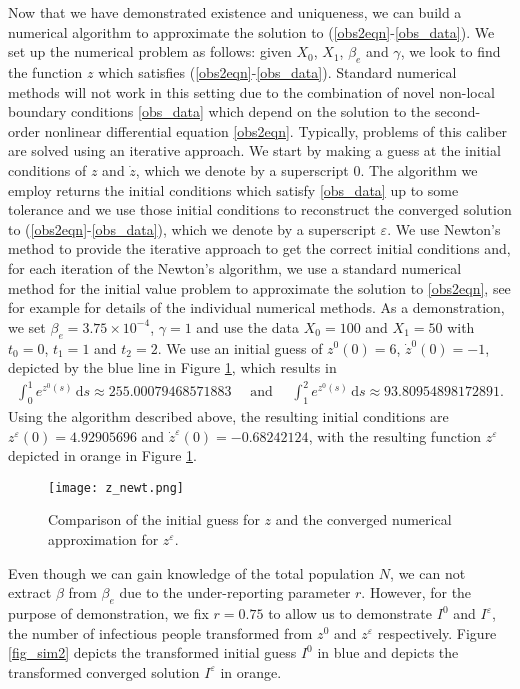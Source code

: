 \documentclass{article}
\newcommand{\ds}{\text{d}s}
\newcommand{\obs}{(\ref{obs2eqn}-\ref{obs_data})}
\newcommand{\be}{\beta_e}
\newcommand{\eps}{\varepsilon}
\begin{document}
Now that we have demonstrated existence and uniqueness, we can build a numerical algorithm to approximate the solution to \obs. We set up the numerical problem as follows: given $X_0$, $X_1$, $\be$ and $\gamma$, we look to find the function $z$ which satisfies \obs. Standard numerical methods will not work in this setting due to the combination of novel non-local boundary conditions \eqref{obs_data} which depend on the solution to the second-order nonlinear differential equation \eqref{obs2eqn}. Typically, problems of this caliber are solved using an iterative approach. We start by making a guess at the initial conditions of $z$ and $\dot{z}$, which we denote by a superscript 0. The algorithm we employ returns the initial conditions which satisfy \eqref{obs_data} up to some tolerance and we use those initial conditions to reconstruct the converged solution to \obs, which we denote by a superscript $\eps$. We use Newton's method to provide the iterative approach to get the correct initial conditions and, for each iteration of the Newton's algorithm, we use a standard numerical method for the initial value problem to approximate the solution to \eqref{obs2eqn}, see for example \cite{PVTF86} for details of the individual numerical methods. As a demonstration, we set $\be = 3.75\times10^{-4}$, $\gamma = 1$ and use the data $X_0 = 100$ and $X_1 = 50$ with $t_0 = 0$, $t_1 = 1$ and $t_2 = 2$. We use an initial guess of $z^0(0) = 6$, $\dot{z}^0(0) = -1$, depicted by the blue line in Figure \ref{fig_sim}, which results in
%
\begin{align*}
    \int_0^1 e^{z^0(s)} \, \ds \approx 255.00079468571883 \quad \text{ and } \quad \int_1^2 e^{z^0(s)} \, \ds \approx 93.80954898172891.
\end{align*}
%
Using the algorithm described above, the resulting initial conditions are $z^\eps(0) = 4.92905696$ and $\dot{z}^\eps(0) = -0.68242124$, with the resulting function $z^\eps$ depicted in orange in Figure \ref{fig_sim}. 

\begin{figure}[!ht]
    \centering
    \texttt{[image: z\_newt.png]}
    \caption{Comparison of the initial guess for $z$ and the converged numerical approximation for $z^\eps$.}
    \label{fig_sim}
\end{figure}

Even though we can gain knowledge of the total population $N$, we can not extract $\beta$ from $\be$ due to the under-reporting parameter $r$. However, for the purpose of demonstration, we fix $r=0.75$ to allow us to demonstrate $I^0$ and $I^\eps$, the number of infectious people transformed from $z^0$ and $z^\eps$ respectively. Figure \ref{fig_sim2} depicts the transformed initial guess $I^0$ in blue and depicts the transformed converged solution $I^\eps$ in orange. 
\end{document}
